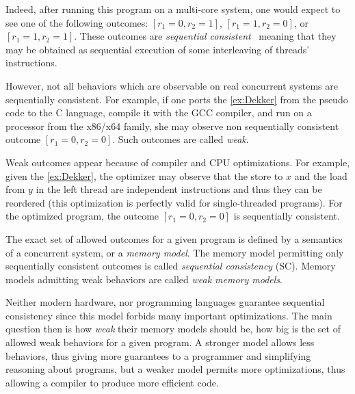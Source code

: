 Indeed, after running this program on a multi-core system, one would expect to see 
one of the following outcomes: $[r_1=0, r_2=1]$, $[r_1=1,r_2=0]$, or $[r_1=1,r_2=1]$.
These outcomes are \emph{sequential consistent}~\cite{Lamport:TC79} meaning
that they may be obtained as sequential execution 
of some interleaving of threads' instructions.



However, not all behaviors which are observable on real concurrent systems are sequentially consistent. 
For example, if one ports the \ref{ex:Dekker} 
from the pseudo code to the C language, compile it with the GCC compiler, 
and run on a processor from the x86/x64 family,
she may observe non sequentially consistent outcome $[r_1=0, r_2=0]$.
Such outcomes are called \emph{weak}.

Weak outcomes appear because of compiler and CPU optimizations.
For example, given the \ref{ex:Dekker},
the optimizer may observe that the store to $x$ and the load from $y$ in the left thread
are independent instructions and thus they can be reordered
(this optimization is perfectly valid for single-threaded programs).
For the optimized program, the outcome $[r_1=0, r_2=0]$
is sequentially consistent.

The exact set of allowed outcomes for a given program 
is defined by a semantics of a concurrent system, or a \emph{memory model}.
The memory model permitting only sequentially consistent outcomes 
is called \emph{sequential consistency} (SC).
Memory models admitting weak behaviors are called \emph{weak memory models}.

Neither modern hardware, nor programming languages 
guarantee sequential consistency since this model forbids many important optimizations.
The main question then is how \emph{weak} their memory models should be,
\ie how big is the set of allowed weak behaviors for a given program.
A stronger model allows less behaviors, thus giving more guarantees to a programmer
and simplifying reasoning about programs, but a weaker model permits more optimizations,
thus allowing a compiler to produce more efficient code.

